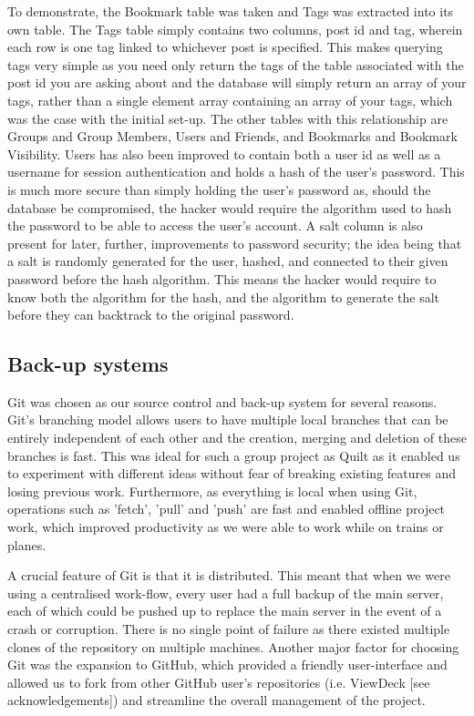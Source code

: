 \documentclass[a4wide, 10pt]{article}
\begin{document}
To demonstrate, the Bookmark table was taken and Tags was extracted into its own table. The Tags table simply contains two columns, post id and tag, wherein each row is one tag linked to whichever post is specified. This makes querying tags very simple as you need only return the tags of the table associated with the post id you are asking about and the database will simply return an array of your tags, rather than a single element array containing an array of your tags, which was the case with the initial set-up. The other tables with this relationship are Groups and Group Members, Users and Friends, and Bookmarks and Bookmark Visibility. Users has also been improved to contain both a user id as well as a username for session authentication and holds a hash of the user's password. This is much more secure than simply holding the user's password as, should the database be compromised, the hacker would require the algorithm used to hash the password to be able to access the user's account. A salt column is also present for later, further, improvements to password security; the idea being that a salt is randomly generated for the user, hashed, and connected to their given password before the hash algorithm. This means the hacker would require to know both the algorithm for the hash, and the algorithm to generate the salt before they can backtrack to the original password.

\subsection{Back-up systems}

Git was chosen as our source control and back-up system for several reasons. Git's branching model allows users to have multiple local branches that can be entirely independent of each other and the creation, merging and deletion of these branches is fast. This was ideal for such a group project as Quilt as it enabled us to experiment with different ideas without fear of breaking existing features and losing  previous work. Furthermore, as everything is local when using Git, operations such as 'fetch', 'pull' and 'push' are fast and enabled offline project work, which improved productivity as we were able to work while on trains or planes.  

A crucial feature of Git is that it is distributed. This meant that when we were using a centralised work-flow, every user had a full backup of the main server, each of which could be pushed up to replace the main server in the event of a crash or corruption. There is no single point of failure as there existed multiple clones of the repository on multiple machines. Another major factor for choosing Git was the expansion to GitHub, which provided a friendly user-interface and allowed us to fork from other GitHub user's repositories (i.e. ViewDeck [see acknowledgements]) and streamline the overall management of the project.
\end{document}
